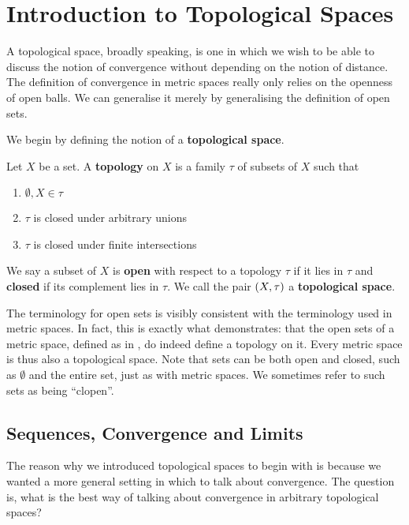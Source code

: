 \section{Introduction to Topological Spaces}

A topological space, broadly speaking, is one in which we wish to be able to discuss the notion of convergence without depending on the notion of distance. The definition of convergence in metric spaces really only relies on the openness of open balls. We can generalise it merely by generalising the definition of open sets.

We begin by defining the notion of a \textbf{topological space}.

\begin{boxdefinition}
    Let $X$ be a set. A \textbf{topology} on $X$ is a family $\tau$ of subsets of $X$ such that
    \begin{enumerate}
        \item $\emptyset, X \in \tau$
        \item $\tau$ is closed under arbitrary unions
        \item $\tau$ is closed under finite intersections
    \end{enumerate}
    We say a subset of $X$ is \textbf{open} with respect to a topology $\tau$ if it lies in $\tau$ and \textbf{closed} if its complement lies in $\tau$. We call the pair $\left( X, \tau \right)$ a \textbf{topological space}.
\end{boxdefinition}

The terminology for open sets is visibly consistent with the terminology used in metric spaces. In fact, this is exactly what  demonstrates: that the open sets of a metric space, defined as in , do indeed define a topology on it. Every metric space is thus also a topological space. Note that sets can be both open and closed, such as $\emptyset$ and the entire set, just as with metric spaces. We sometimes refer to such sets as being ``clopen''.

\subsection{Sequences, Convergence and Limits}

The reason why we introduced topological spaces to begin with is because we wanted a more general setting in which to talk about convergence. The question is, what is the best way of talking about convergence in arbitrary topological spaces?

